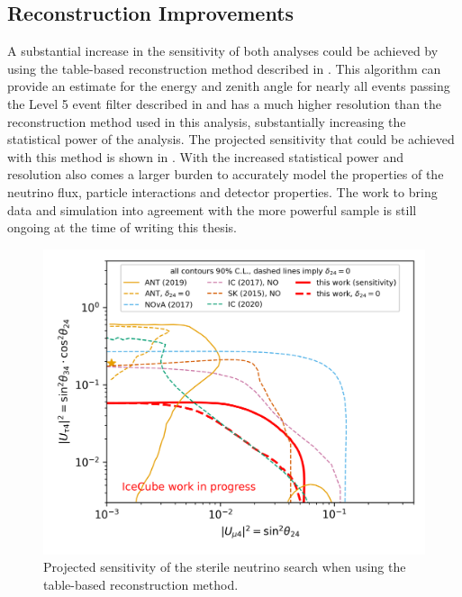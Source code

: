 \subsection{Reconstruction Improvements}
A substantial increase in the sensitivity of both analyses could be achieved by using the table-based reconstruction method described in \cite{lowen-reco-paper}. This algorithm can provide an estimate for the energy and zenith angle for nearly all events passing the Level 5 event filter described in  and has a much higher resolution than the reconstruction method used in this analysis, substantially increasing the statistical power of the analysis. The projected sensitivity that could be achieved with this method is shown in . With the increased statistical power and resolution also comes a larger burden to accurately model the properties of the neutrino flux, particle interactions and detector properties. The work to bring data and simulation into agreement with the more powerful sample is still ongoing at the time of writing this thesis.
\begin{figure}
    \centering
    \includegraphics[width=0.7\linewidth]{figures/summary/Sterile_mixing_sensitivity_90pct_retro.png}
    \caption{Projected sensitivity of the sterile neutrino search when using the table-based reconstruction method.\label{fig:retro-sensitivity}}
\end{figure}

